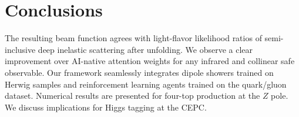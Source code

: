 \section{Conclusions}\label{sec:conclusions}

The resulting beam function agrees with light-flavor likelihood ratios
of semi-inclusive deep inelastic scattering after unfolding. We observe
a clear improvement over AI-native attention weights for any infrared
and collinear safe observable. Our framework seamlessly integrates
dipole showers trained on Herwig samples and reinforcement learning
agents trained on the quark/gluon dataset. Numerical results are
presented for four-top production at the $Z$ pole. We discuss
implications for Higgs tagging at the CEPC.

